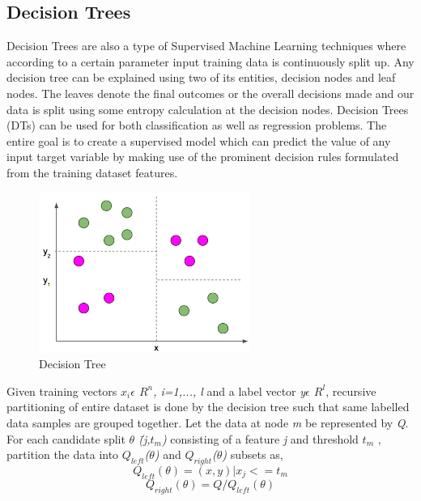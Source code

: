 \documentclass[a4paper, 10pt, conference]{IEEEtran}
\begin{document}
\subsection{Decision Trees}
Decision Trees are also a type of Supervised Machine Learning techniques where according to a certain parameter input training data is continuously split up. Any decision tree can be explained using two of its entities, decision nodes and leaf nodes. The leaves denote the final outcomes or the overall decisions made and our data is split using some entropy calculation at the decision nodes.
Decision Trees (DTs) can be used for both classification as well as regression problems. The entire goal is to create a supervised model which can predict the value of any input target variable by making use of the prominent decision rules formulated from the training dataset features.
\begin{figure}
  \includegraphics[width=\linewidth]{DecisionTree.png}
  \caption{Decision Tree}
  \label{fig:dt}
\end{figure}

Given training vectors \textit{$x_{i}\epsilon$ $R^{n}$, i=1,..., l} and a label  vector \textit{y$\epsilon$ $R^{l}$}, recursive partitioning of entire dataset is done by the decision tree such that same labelled data samples are grouped together. Let the data at node \textit{m} be represented by \textit{Q}. For each candidate split \textit{$\theta$ \= (j,$t_{m}$)} consisting of a feature \textit{j} and threshold \textit{$t_{m}$} , partition the data into \textit{$Q_{left}$($\theta$)} and \textit{$Q_{right}$($\theta$)} subsets as,
\[ Q_{left}(\theta) = (x,y)|x_{j}<=t_{m}
\]
\[ Q_{right}(\theta) = Q/Q_{left}(\theta)
\]
\end{document}
